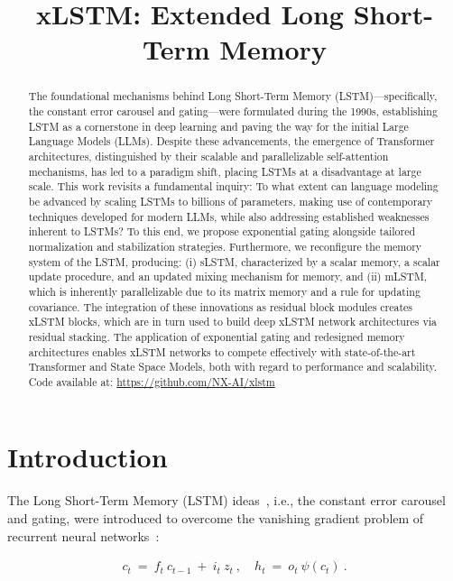 \title{xLSTM: Extended Long Short-Term Memory}

\begin{abstract}
The foundational mechanisms behind Long Short-Term Memory (LSTM)—specifically, the constant error carousel and gating—were formulated during the 1990s, establishing LSTM as a cornerstone in deep learning and paving the way for the initial Large Language Models (LLMs). Despite these advancements, the emergence of Transformer architectures, distinguished by their scalable and parallelizable self-attention mechanisms, has led to a paradigm shift, placing LSTMs at a disadvantage at large scale. This work revisits a fundamental inquiry: To what extent can language modeling be advanced by scaling LSTMs to billions of parameters, making use of contemporary techniques developed for modern LLMs, while also addressing established weaknesses inherent to LSTMs? To this end, we propose exponential gating alongside tailored normalization and stabilization strategies. Furthermore, we reconfigure the memory system of the LSTM, producing: (i) sLSTM, characterized by a scalar memory, a scalar update procedure, and an updated mixing mechanism for memory, and (ii) mLSTM, which is inherently parallelizable due to its matrix memory and a rule for updating covariance. The integration of these innovations as residual block modules creates xLSTM blocks, which are in turn used to build deep xLSTM network architectures via residual stacking. The application of exponential gating and redesigned memory architectures enables xLSTM networks to compete effectively with state-of-the-art Transformer and State Space Models, both with regard to performance and scalability.\\
Code available at: \url{https://github.com/NX-AI/xlstm}
\end{abstract}

\section{Introduction}
\label{sec:intro}

The Long Short-Term Memory (LSTM) ideas~\citep{Hochreiter:91,Hochreiter:97nips,Hochreiter:97}, i.e., the constant error carousel and gating, were introduced to overcome the vanishing gradient problem of recurrent neural networks~\citep{Hochreiter:91,Hochreiter:00book}:

\begin{align}
\label{eq:lstm_idea}
  c_t \ = \ f_t \ c_{t-1} \ + \ 
          i_t \  z_t \ , \quad  
          h_t \ = \ o_t \ \psi({c_t}) \ . 
\end{align}

